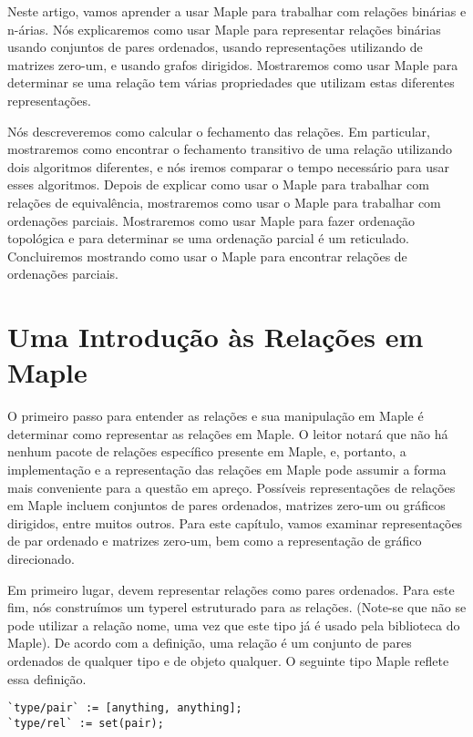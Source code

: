\documentclass[a4paper]{article}
\begin{document}
\rhead{\today}
 

Neste artigo, vamos aprender a usar Maple para trabalhar com relações binárias e n-árias. Nós explicaremos como usar Maple para representar relações binárias usando conjuntos de pares ordenados, usando representações utilizando de matrizes zero-um, e usando grafos dirigidos. Mostraremos como usar Maple para determinar se uma relação tem várias propriedades que utilizam estas diferentes representações.

Nós descreveremos como calcular o fechamento das relações. Em particular, mostraremos como encontrar o fechamento transitivo de uma relação utilizando dois algoritmos diferentes, e nós iremos comparar o tempo necessário para usar esses algoritmos. Depois de explicar como usar o Maple para trabalhar com relações de equivalência, mostraremos como usar o Maple para trabalhar com ordenações parciais. Mostraremos como usar Maple para fazer ordenação topológica e para determinar se uma ordenação parcial é um reticulado. Concluiremos mostrando como usar o Maple para encontrar relações de ordenações parciais.

\section{Uma Introdução às Relações em Maple}
O primeiro passo para entender as relações e sua manipulação em Maple é determinar como representar as relações em Maple. O leitor notará que não há nenhum pacote de relações específico presente em Maple, e, portanto, a implementação e a representação das relações em Maple pode assumir a forma mais conveniente para a questão em apreço. Possíveis representações de relações em Maple incluem conjuntos de pares ordenados, matrizes zero-um ou gráficos dirigidos, entre muitos outros. Para este capítulo, vamos examinar representações de par ordenado e matrizes zero-um, bem como a representação de gráfico direcionado.

Em primeiro lugar, devem representar relações como pares ordenados. Para este fim, nós construímos um typerel estruturado para as relações. (Note-se que não se pode utilizar a relação nome, uma vez que este tipo já é usado pela biblioteca do Maple). De acordo com a definição, uma relação é um conjunto de pares ordenados de qualquer tipo e de objeto qualquer. O seguinte tipo Maple reflete essa definição.

\begin{lstlisting}
`type/pair` := [anything, anything];
`type/rel` := set(pair);
\end{lstlisting}
\end{document}
